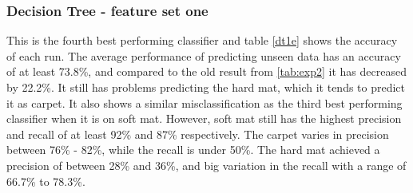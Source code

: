 \documentclass[USenglish]{ifimaster}  %
\begin{document}
	
	

\subsubsection{Decision Tree - feature set one}
This is the fourth best performing classifier and table \ref{dt1e} shows the accuracy of each run. The average performance of predicting unseen data has an accuracy of at least 73.8\%, and compared to the old result from \ref{tab:exp2} it has decreased by 22.2\%. It still has problems predicting the hard mat, which it tends to predict it as carpet. It also shows a similar misclassification as the third best performing classifier when it is on soft mat. However, soft mat still has the highest precision and recall of at least 92\% and 87\% respectively. The carpet varies in precision between 76\% - 82\%, while the recall is under 50\%. The hard mat achieved a precision of between 28\% and 36\%, and big variation in the recall with a range of 66.7\% to 78.3\%.
\end{document}

